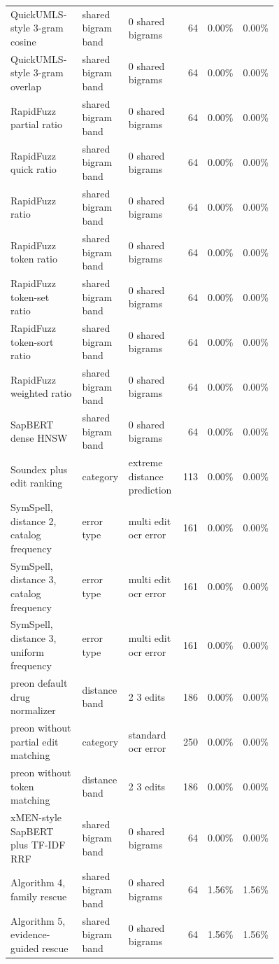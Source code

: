 \begin{scriptsize}
\begin{longtable}{@{}L{0.35\linewidth}L{0.18\linewidth}L{0.23\linewidth}rrr@{}}
QuickUMLS-style 3-gram cosine & shared bigram band & 0 shared bigrams & 64 & 0.00\% & 0.00\% \\
QuickUMLS-style 3-gram overlap & shared bigram band & 0 shared bigrams & 64 & 0.00\% & 0.00\% \\
RapidFuzz partial ratio & shared bigram band & 0 shared bigrams & 64 & 0.00\% & 0.00\% \\
RapidFuzz quick ratio & shared bigram band & 0 shared bigrams & 64 & 0.00\% & 0.00\% \\
RapidFuzz ratio & shared bigram band & 0 shared bigrams & 64 & 0.00\% & 0.00\% \\
RapidFuzz token ratio & shared bigram band & 0 shared bigrams & 64 & 0.00\% & 0.00\% \\
RapidFuzz token-set ratio & shared bigram band & 0 shared bigrams & 64 & 0.00\% & 0.00\% \\
RapidFuzz token-sort ratio & shared bigram band & 0 shared bigrams & 64 & 0.00\% & 0.00\% \\
RapidFuzz weighted ratio & shared bigram band & 0 shared bigrams & 64 & 0.00\% & 0.00\% \\
SapBERT dense HNSW & shared bigram band & 0 shared bigrams & 64 & 0.00\% & 0.00\% \\
Soundex plus edit ranking & category & extreme distance prediction & 113 & 0.00\% & 0.00\% \\
SymSpell, distance 2, catalog frequency & error type & multi edit ocr error & 161 & 0.00\% & 0.00\% \\
SymSpell, distance 3, catalog frequency & error type & multi edit ocr error & 161 & 0.00\% & 0.00\% \\
SymSpell, distance 3, uniform frequency & error type & multi edit ocr error & 161 & 0.00\% & 0.00\% \\
preon default drug normalizer & distance band & 2 3 edits & 186 & 0.00\% & 0.00\% \\
preon without partial edit matching & category & standard ocr error & 250 & 0.00\% & 0.00\% \\
preon without token matching & distance band & 2 3 edits & 186 & 0.00\% & 0.00\% \\
xMEN-style SapBERT plus TF-IDF RRF & shared bigram band & 0 shared bigrams & 64 & 0.00\% & 0.00\% \\
Algorithm 4, family rescue & shared bigram band & 0 shared bigrams & 64 & 1.56\% & 1.56\% \\
Algorithm 5, evidence-guided rescue & shared bigram band & 0 shared bigrams & 64 & 1.56\% & 1.56\% \\
\bottomrule
\end{longtable}
\end{scriptsize}

